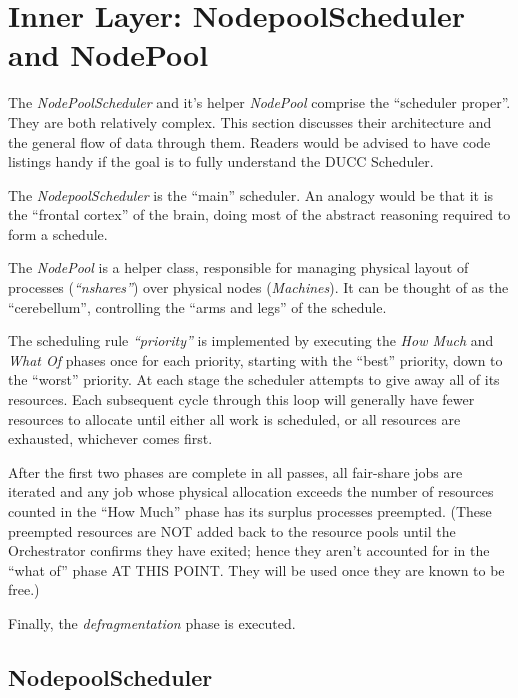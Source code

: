\section{Inner Layer: NodepoolScheduler and NodePool}
   The {\em NodePoolScheduler} and it's helper {\em NodePool} comprise the ``scheduler proper''.  They are
   both relatively complex.  This section discusses their architecture and the general flow of data
   through them.  Readers would be advised to have code listings handy if the goal is to fully understand
   the DUCC Scheduler.

   The {\em NodepoolScheduler} is the ``main'' scheduler.  An analogy would be that it is the ``frontal cortex''
   of the brain, doing most of the abstract reasoning required to form a schedule.

   The {\em NodePool} is a helper class, responsible for managing physical layout of processes ({\em ``nshares''})
   over physical nodes ({\em Machines}).  It can be thought of as the ``cerebellum'', controlling the ``arms and legs''
   of the schedule.

    The scheduling rule {\em ``priority''} is implemented by executing the {\em How Much} and {\em
      What Of} phases once for each priority, starting with the ``best'' priority, down to the
    ``worst'' priority.  At each stage the scheduler attempts to give away all of its
    resources. Each subsequent cycle through this loop will generally have fewer resources to
    allocate until either all work is scheduled, or all resources are exhausted, whichever comes
    first.

    After the first two phases are complete in all passes, all fair-share jobs are iterated and any job whose
    physical allocation exceeds the number of resources counted in the ``How Much'' phase has its surplus
    processes preempted.  (These preempted resources are NOT added back to the resource pools until the Orchestrator
    confirms they have exited; hence they aren't accounted for in the ``what of'' phase AT THIS POINT. They
    will be used once they are known to be free.)

    Finally, the {\em defragmentation} phase is executed.

\subsection{NodepoolScheduler}

